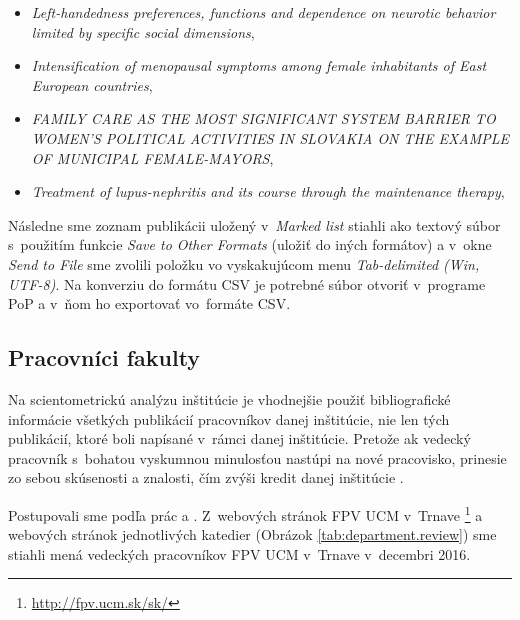 \begin{itemize}
\item \emph{Left-handedness preferences, functions and dependence on neurotic
    behavior limited by specific social dimensions},
\item \emph{Intensification of menopausal symptoms among female inhabitants of
    East European countries},
\item \emph{FAMILY CARE AS THE MOST SIGNIFICANT SYSTEM BARRIER TO WOMEN'S
    POLITICAL ACTIVITIES IN SLOVAKIA ON THE EXAMPLE OF MUNICIPAL FEMALE-MAYORS},
\item \emph{Treatment of lupus-nephritis and its course through the maintenance
    therapy},
\end{itemize}

Následne sme zoznam publikácii uložený v~\emph{Marked list} stiahli ako textový
súbor s~použitím funkcie \emph{Save to Other Formats} (uložiť do iných formátov)
a v~okne \emph{Send to File} sme zvolili položku vo vyskakujúcom menu
\emph{Tab-delimited (Win, UTF-8)}. Na konverziu do formátu CSV je potrebné súbor
otvoriť v~programe PoP \citep{Harzing2011} a v~ňom ho exportovať vo~formáte CSV.


\subsection{Pracovníci fakulty}
\label{sec:staff.mining}

Na scientometrickú analýzu inštitúcie je vhodnejšie použiť bibliografické
informácie všetkých publikácií pracovníkov danej inštitúcie, nie len tých
publikácií, ktoré boli napísané v~rámci danej inštitúcie. Pretože ak vedecký
pracovník s~bohatou vyskumnou minulosťou nastúpi na nové pracovisko, prinesie zo
sebou skúsenosti a znalosti, čím zvýši kredit danej inštitúcie
\citep{Altanopoulou2012}.

Postupovali sme podľa prác \citet{Kazakis2014a} a
\citet{Kazakis2014b,Kazakis2015}.  Z~webových stránok FPV UCM v~Trnave
\footnote{\url{http://fpv.ucm.sk/sk/}} a webových stránok jednotlivých katedier
(Obrázok \ref{tab:department.review}) sme stiahli mená vedeckých pracovníkov FPV
UCM v~Trnave v~decembri 2016.

